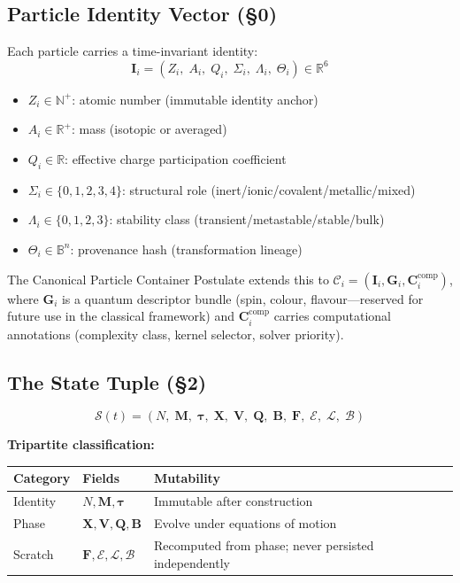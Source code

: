 \documentclass[11pt, a4paper]{article}
\newcommand{\R}{\mathbb{R}}
\newcommand{\N}{\mathbb{N}}
\newcommand{\boldI}{\mathbf{I}}
\newcommand{\boldG}{\mathbf{G}}
\begin{document}
\subsection{Particle Identity Vector (\S0)}

Each particle carries a time-invariant identity:
\begin{equation}
\boldI_i = (Z_i,\; A_i,\; Q_i,\; \Sigma_i,\; \Lambda_i,\; \Theta_i) \in \R^6
\end{equation}

\begin{itemize}
\item $Z_i \in \N^+$: atomic number (immutable identity anchor)
\item $A_i \in \R^+$: mass (isotopic or averaged)
\item $Q_i \in \R$: effective charge participation coefficient
\item $\Sigma_i \in \{0,1,2,3,4\}$: structural role (inert/ionic/covalent/metallic/mixed)
\item $\Lambda_i \in \{0,1,2,3\}$: stability class (transient/metastable/stable/bulk)
\item $\Theta_i \in \mathbb{B}^n$: provenance hash (transformation lineage)
\end{itemize}

The Canonical Particle Container Postulate extends this to $\mathcal{C}_i = (\boldI_i, \boldG_i, \mathbf{C}_i^\text{comp})$, where $\boldG_i$ is a quantum descriptor bundle (spin, colour, flavour---reserved for future use in the classical framework) and $\mathbf{C}_i^\text{comp}$ carries computational annotations (complexity class, kernel selector, solver priority).

\subsection{The State Tuple (\S2)}

\begin{equation}
\mathcal{S}(t) = (N,\; \mathbf{M},\; \boldsymbol{\tau},\; \mathbf{X},\; \mathbf{V},\; \mathbf{Q},\; \mathbf{B},\; \mathbf{F},\; \mathcal{E},\; \mathcal{L},\; \mathcal{B})
\end{equation}

\textbf{Tripartite classification:}

\begin{center}
\begin{tabular}{lll}
\toprule
Category & Fields & Mutability \\
\midrule
Identity & $N, \mathbf{M}, \boldsymbol{\tau}$ & Immutable after construction \\
Phase & $\mathbf{X}, \mathbf{V}, \mathbf{Q}, \mathbf{B}$ & Evolve under equations of motion \\
Scratch & $\mathbf{F}, \mathcal{E}, \mathcal{L}, \mathcal{B}$ & Recomputed from phase; never persisted independently \\
\bottomrule
\end{tabular}
\end{center}
\end{document}
